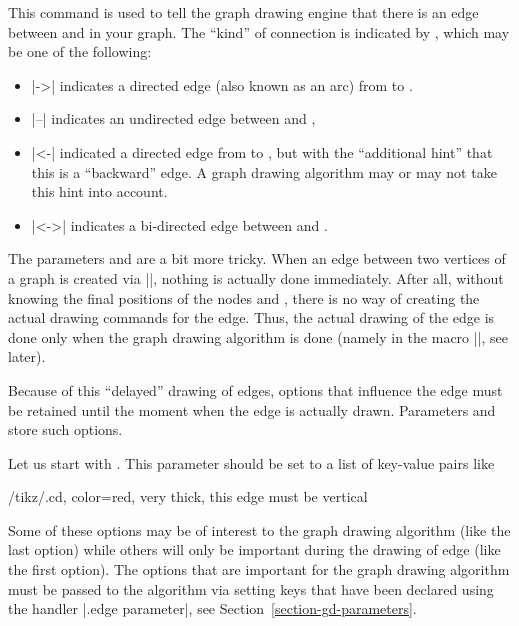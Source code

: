 \begin{command}{\pgfgdedge{}}
  This command is used to tell the graph drawing engine that there is
  an edge between  and  in your
  graph. The ``kind'' of connection is indicated by ,
  which may be one of the following:
  \begin{itemize}
  \item 
    |->| indicates a directed edge (also known as an arc) from
     to .
  \item |--| indicates an undirected edge between 
    and ,
  \item |<-| indicated a directed edge from  to
    , but with the ``additional hint'' that this is a
    ``backward'' edge. A graph drawing algorithm may  or may not take
    this hint into account.
  \item |<->| indicates a bi-directed edge between 
    and . 
  \end{itemize}
  The parameters  and  are a bit
  more tricky. When an edge between two vertices of a graph is created
  via |\pgfgdedge|, nothing is actually done immediately. After all,
  without knowing the final positions of the nodes 
  and , there is no way of creating the actual
  drawing commands for the edge. Thus, the actual drawing of the edge
  is done only when the graph drawing algorithm is done (namely in the
  macro |\pgfgdedgecallback|, see later). 

  Because of this ``delayed'' drawing of edges, options that influence
  the edge must be retained until the moment when the edge is actually
  drawn. Parameters  and  store such
  options. 

  Let us start with . This parameter should be set
  to a list of key-value pairs like
\begin{codeexample}
/tikz/.cd, color=red, very thick, this edge must be vertical
\end{codeexample}
  Some of these options may be of interest to the graph drawing
  algorithm (like the last option) while others will 
  only be important during the drawing of edge (like the first
  option). The options that are important for the graph drawing
  algorithm must be passed to the algorithm via setting keys that have
  been declared using the handler |.edge parameter|, see
  Section~\ref{section-gd-parameters}. 


\end{command}
